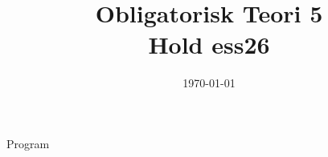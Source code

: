 \documentclass[11pt,aspectratio=169]{beamer}
\title{Obligatorisk Teori 5 \\
Hold ess26}
\date{\today}
\begin{document}
\begin{frame}
  \titlepage
\end{frame}

\begin{frame}{Program}
  \tableofcontents
\end{frame}












\end{document}
